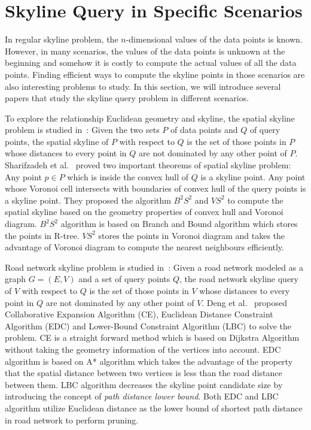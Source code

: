 \section{Skyline Query in Specific Scenarios}
\label{sec:rel:constrain}
In regular skyline problem, the $n$-dimensional values of the data points is known. However, in many scenarios, the values of the data points is unknown at the beginning and somehow it is costly to compute the actual values of all the data points. Finding efficient ways to compute the skyline points in those scenarios are also interesting problems to study. In this section, we will introduce several papers that study the skyline query problem in different scenarios.

To explore the relationship Euclidean geometry and skyline, the spatial skyline problem is studied in~\cite{sharifzadeh2006spatial}: Given the two sets $P$ of data points and $Q$ of query points, the spatial skyline of $P$ with respect to $Q$ is the set of those points in $P$ whose distances to every point in $Q$ are not dominated by any other point of $P$. Sharifzadeh et al.~\cite{sharifzadeh2006spatial} proved two important theorems of spatial skyline problem: Any point $p \in P$ which is inside the convex hull of $Q$ is a skyline point. Any point whose Voronoi cell intersects with boundaries of convex hull of the query points is a skyline point. They proposed the algorithm $B^2S^2$ and $VS^2$ to compute the spatial skyline based on the geometry properties of convex hull and Voronoi diagram. $B^2S^2$ algorithm is based on Branch and Bound algorithm which stores the points in R-tree. $VS^2$ stores the points in Voronoi diagram and takes the advantage of Voronoi diagram to compute the nearest neighbours efficiently.

Road network skyline problem is studied in~\cite{deng2007multi}: Given a road network modeled as a graph $G=(E, V)$ and a set of query points $Q$, the road network skyline query of $V$ with respect to $Q$ is the set of those points in $V$ whose distances to every point in $Q$ are not dominated by any other point of $V$. Deng et al.~\cite{deng2007multi} proposed Collaborative Expansion Algorithm (CE), Euclidean Distance Constraint Algorithm (EDC) and Lower-Bound Constraint Algorithm (LBC) to solve the problem. CE is a straight forward method which is based on Dijkstra Algorithm without taking the geometry information of the vertices into account. EDC algorithm is based on A* algorithm which takes the advantage of the property that the spatial distance between two vertices is less than the road distance between them. LBC algorithm decreases the skyline point candidate size by introducing the concept of \emph{path distance lower bound}. Both EDC and LBC algorithm utilize Euclidean distance as the lower bound of shortest path distance in road network to perform pruning. 

